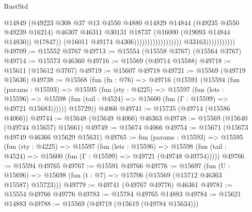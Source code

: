 \begin{lexlean}{RustStd}
\begin{coremodule}
                                                              @14849
                                                              (@49223
                                                                @308
                                                                @37
                                                                @13
                                                                @4550
                                                                @4880
                                                                @14829
                                                                @14844
                                                                (@49235 @4550 @49239 @16214)
                                                                @46307
                                                                @46311
                                                                @30131
                                                                @18737
                                                                (@16000 (@19093 @14844 @14830))
                                                                @17847))
                                                            (@16011 @49174 @4306))))))))))))))))))
                          @33163)))))))))))
@49709 := @15552 @3767
@49713 := @15554 (@15558 @3767) (@15564 @3767)
@49714 := @15573 @46360
@49716 := @15569 (@49714 @15588)
@49718 := @15611 (@15612 @3767)
@49719 := @15607 @49718
@49721 := @15569 (@49719 @15636)
@49738 := @15568
    (fun (fn : @76) =>
    @49716
      (@15591
        (@15594
          (fun (params : @15593) =>
          @15595
            (fun (rty : @4225) =>
            @15597
              (fun (lets : @15596) =>
              @15598 (fun (tail : @4524) => @15600 (fun (Γ : @15599) => @49721 @15683))))))
        @15729))
    @4066
@49741 := @15735 (@49714 (@15586 @4066))
@49744 := @15648 (@15649 @4066) @46363
@49748 := @15569 (@15640 (@49744 @15657) @15661)
@49749 := @15674 @4066
@49754 := @15671 (@15673 @49749 @46366 @15629 @15631)
@49765 := fun (params : @15593) =>
  @15595
    (fun (rty : @4225) =>
    @15597
      (fun (lets : @15596) =>
      @15598 (fun (tail : @4524) => @15600 (fun (Γ : @15599) => @49721 (@49748 @49754)))))
@49766 := @15594 @49765
@49767 := @15591 @49766
@49776 := @15697
    (fun (U : @15696) => @15698 (fun (t : @7) => @15706 (@15569 (@15712 @46363 @15587) @15723)))
@49779 := @49741 (@49767 @49776) @46361
@49781 := @15554 @49766 @49776
@49783 := @15784 @49765 @14883
@49784 := @15621 @14883
@49788 := @15569 (@49719 (@15619 (@49784 @15634)))

\end{coremodule}
\end{lexlean}
